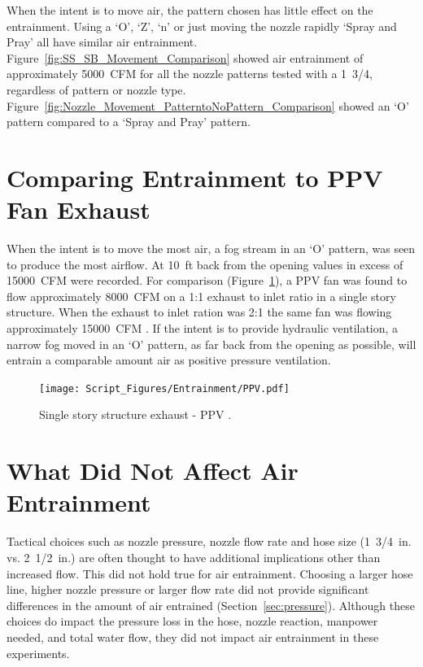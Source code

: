 \documentclass[12pt,oneside]{book}
\begin{document}
When the intent is to move air, the pattern chosen has little effect on the entrainment. Using a `O', `Z', `n' or just moving the nozzle rapidly `Spray and Pray' all have similar air entrainment. Figure~\ref{fig:SS_SB_Movement_Comparison} showed air entrainment of approximately 5000~CFM for all the nozzle patterns tested with a 1~3/4, regardless of pattern or nozzle type. Figure~\ref{fig:Nozzle_Movement_PatterntoNoPattern_Comparison} showed an `O' pattern compared to a `Spray and Pray' pattern.

\section{Comparing Entrainment to PPV Fan Exhaust}
When the intent is to move the most air, a fog stream in an `O' pattern, was seen to produce the most airflow. At 10~ft back from the opening values in excess of 15000~CFM were recorded. For comparison (Figure~\ref{fig:PPV}), a PPV fan was found to flow approximately 8000~CFM on a 1:1 exhaust to inlet ratio in a single story structure. When the exhaust to inlet ration was 2:1 the same fan was flowing approximately 15000~CFM \cite{Zevotek_Kerber:2016}. If the intent is to provide hydraulic ventilation, a narrow fog moved in an `O' pattern, as far back from the opening as possible, will entrain a comparable amount air as positive pressure ventilation. 

\begin{figure}[H]
\centering
\texttt{[image: Script\_Figures/Entrainment/PPV.pdf]}
\caption[Single Story Structure Exhaust - PPV]{Single story structure exhaust - PPV \cite{Zevotek_Kerber:2016}.}
\label{fig:PPV}
\end{figure}

\section{What Did Not Affect Air Entrainment}
Tactical choices such as nozzle pressure, nozzle flow rate and hose size (1~3/4~in. vs. 2~1/2~in.) are often thought to have additional implications other than increased flow. This did not hold true for air entrainment. Choosing a larger hose line, higher nozzle pressure or larger flow rate did not provide significant differences in the amount of air entrained (Section~\ref{sec:pressure}). Although these choices do impact the pressure loss in the hose, nozzle reaction, manpower needed, and total water flow, they did not impact air entrainment in these experiments.
\end{document}
